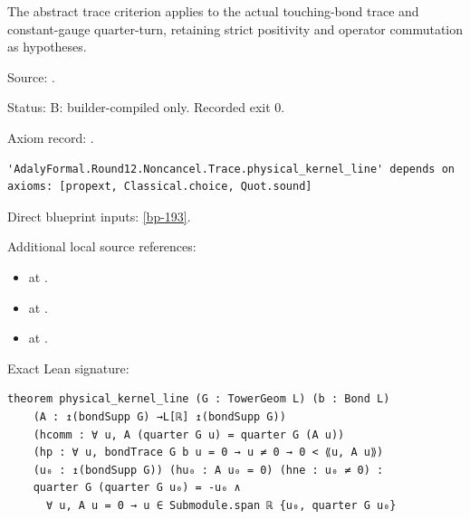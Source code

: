 \begin{theorem}[bp-197]
\label{bp-197}
\leanok
The abstract trace criterion applies to the actual touching-bond trace and constant-gauge quarter-turn, retaining strict positivity and operator commutation as hypotheses.

\par Source: \texttt{}.
\par Status: B: builder-compiled only. Recorded exit 0.
\par Axiom record: \texttt{}.
\begin{verbatim}
'AdalyFormal.Round12.Noncancel.Trace.physical_kernel_line' depends on axioms: [propext, Classical.choice, Quot.sound]
\end{verbatim}
\par Direct blueprint inputs: \ref{bp-193}.
\par Additional local source references:
\begin{itemize}
\item \texttt{} at \texttt{}.
\item \texttt{} at \texttt{}.
\item \texttt{} at \texttt{}.
\end{itemize}
\par Exact Lean signature:
\begin{verbatim}
theorem physical_kernel_line (G : TowerGeom L) (b : Bond L)
    (A : ↥(bondSupp G) →L[ℝ] ↥(bondSupp G))
    (hcomm : ∀ u, A (quarter G u) = quarter G (A u))
    (hp : ∀ u, bondTrace G b u = 0 → u ≠ 0 → 0 < ⟪u, A u⟫)
    (u₀ : ↥(bondSupp G)) (hu₀ : A u₀ = 0) (hne : u₀ ≠ 0) :
    quarter G (quarter G u₀) = -u₀ ∧
      ∀ u, A u = 0 → u ∈ Submodule.span ℝ {u₀, quarter G u₀}
\end{verbatim}
\end{theorem}

